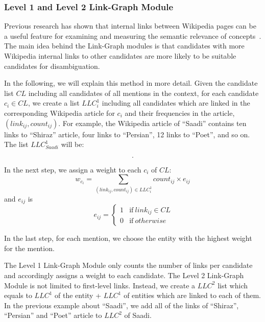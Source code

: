\documentclass{article}
\begin{document}
\subsubsection{Level 1 and Level 2 Link-Graph Module}

Previous research has shown that internal links between Wikipedia pages can be a useful feature for examining and measuring the semantic relevance of concepts~\cite{zhu2019efficient}. The main idea behind the Link-Graph modules is that candidates with more Wikipedia internal links to other candidates are more likely to be suitable candidates for disambiguation. 

In the following, we will explain this method in more detail. Given the candidate list $CL$ including all candidates of all mentions in the context, for each candidate $c_i \in CL$, we create a list $LLC^1_i$ including all candidates which are linked in the corresponding Wikipedia article for $c_i$ and their frequencies in the article, $(link_{ij},count_{ij})$. For example, the Wikipedia article of ``Saadi'' contains ten links to ``Shiraz'' article, four links to ``Persian'', 12 links to ``Poet'', and so on. The list $LLC^1_{Saadi}$ will be:

\begin{equation}
[(Shiraz,10), (Persian,4), (Poet,12), ...]. 
\end{equation}

In the next step, we assign a weight to each $c_i$ of $CL$:
\begin{equation}
w_{c_i} = \sum_{(link_{ij},count_{ij}) \in LLC^1_i} count_{ij} \times e_{ij}
\end{equation}
and $e_{ij}$ is
\begin{equation}
\ e_{ij} =\begin{cases}
1 &  \mathrm{if} ~ link_{ij} \in CL \\
0 &  \mathrm{if} ~ otherwise
\end{cases}
\end{equation}

In the last step, for each mention, we choose the entity with the highest weight for the mention.

The Level 1 Link-Graph Module only counts the number of links per candidate and accordingly assigns a weight to each candidate. The Level 2 Link-Graph Module is not limited to first-level links. Instead, we create a $LLC^2$ list which equals to $LLC^1$ of the entity + $LLC^1$ of entities which are linked to each of them. In the previous example about ``Saadi'', we add all of the links of ``Shiraz'', ``Persian'' and ``Poet'' article to $LLC^2$ of Saadi.
\end{document}
